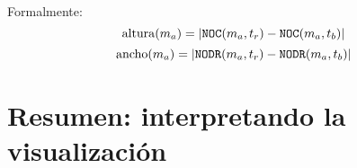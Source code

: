 \par Formalmente:
\[ {\rm altura}(m_a) = \vert {\tt NOC}(m_a,t_r) - {\tt NOC}(m_a,t_b) \vert \]
\[ {\rm ancho}(m_a) = \vert {\tt NODR}(m_a,t_r) - {\tt NODR}(m_a,t_b) \vert \]


\section{Resumen: interpretando la visualización}

